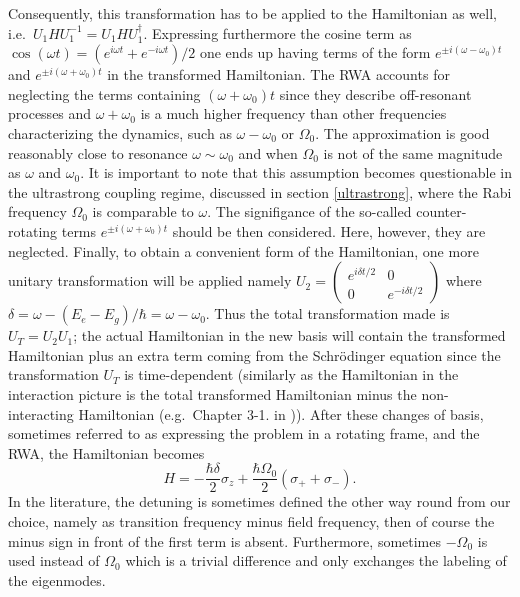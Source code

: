 \documentclass[12pt]{iopart}
\begin{document}
Consequently, this transformation has to be applied to the Hamiltonian as well, i.e.\ $U_1 H U^{-1}_1 = U_1 H U^\dagger_1$. 
Expressing furthermore the cosine term  as $\cos (\omega t)
= (e^{i\omega t} + e^{-i\omega t})/2$ one ends up having terms of the form 
$e^{\pm i(\omega - \omega_0)t}$ and $e^{\pm i(\omega + \omega_0)t}$ in the transformed Hamiltonian. The RWA accounts
for neglecting the terms containing $(\omega + \omega_0)t$ since they describe off-resonant processes and 
$\omega + \omega_0$ is a much higher frequency than other frequencies characterizing the dynamics, such as
$\omega - \omega_0$ or $\Omega_0$. The approximation is good reasonably close to resonance $\omega \sim \omega_0$ and
when $\Omega_0$ is not of the same magnitude as $\omega$ and $\omega_0$. It is important to note that this assumption becomes questionable in the ultrastrong coupling
regime, discussed in section \ref{ultrastrong}, where the Rabi frequency $\Omega_0$ is comparable to $\omega$. The signifigance of
the so-called counter-rotating terms $e^{\pm i(\omega + \omega_0)t}$ should be then considered. Here, however, 
they are neglected. Finally, to obtain a convenient form of the Hamiltonian, one more unitary transformation will be
applied namely $U_2 = \left(\begin{array}{cc}
e^{i\delta t/2} & 0\\
0 & e^{-i\delta t/2} \end{array}\right)$ where $\delta = \omega - (E_e-E_g)/\hbar = \omega - \omega_0$. Thus the total transformation
made is $U_T = U_2 U_1$; the actual Hamiltonian in the new basis will contain the transformed Hamiltonian plus an extra term
coming from the Schr\"odinger equation since the transformation $U_T$ is time-dependent (similarly as the Hamiltonian in the interaction
picture is the total transformed Hamiltonian minus the non-interacting Hamiltonian (e.g.\ Chapter 3-1. in \cite{Meystre91})).
After these changes of basis, sometimes referred to as expressing the problem in a rotating frame, and the RWA, the Hamiltonian becomes    
\begin{equation}
H = - \frac{\hbar\delta}{2} \sigma_z + \frac{\hbar \Omega_0}{2} (\sigma_+ + \sigma_-) . \label{semiclassicalHPT}
\end{equation} 
In the literature, the detuning is sometimes defined the other way round from our choice, namely as transition frequency 
minus field frequency, then
of course the minus sign in front of the first term is absent. Furthermore, sometimes $-\Omega_0$ is used instead of 
$\Omega_0$ which is a trivial difference and only exchanges the labeling of the eigenmodes.
\end{document}
